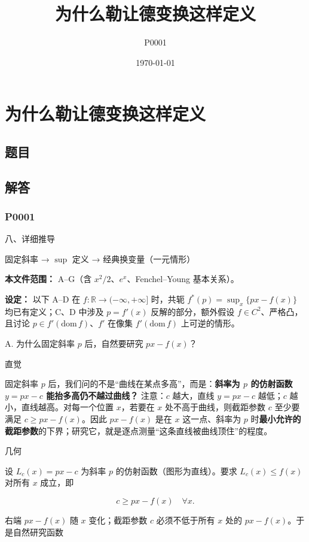 \documentclass[
    lang=cn,
    color=blue,
    mode=fancy,
    thmcnt=section,
    scheme=chinese
]{elegantbook}
\title{为什么勒让德变换这样定义}
\subtitle{P0001}
\author{}
\institute{}
\date{\today}
\begin{document}
\maketitle
\mainmatter

\chapter{为什么勒让德变换这样定义}

\section{题目}

\section{解答}
\subsection{P0001}
八、详细推导

固定斜率 → $\sup$ 定义 → 经典换变量（一元情形）

\textbf{本文件范围：} A–G（含 $x^2/2$、$e^x$、Fenchel–Young 基本关系）。

\textbf{设定：} 以下 A–D 在 $f : \mathbb{R} \to (-\infty, +\infty]$ 时，共轭 $f^*(p)=\sup_x\{px-f(x)\}$ 均已有定义；C、D 中涉及 $p=f'(x)$ 反解的部分，额外假设 $f \in C^2$、严格凸，且讨论 $p \in f'(\mathrm{dom}\, f)$、$f'$ 在像集 $f'(\mathrm{dom}\, f)$ 上可逆的情形。

\par
A. 为什么固定斜率 $p$ 后，自然要研究 $px - f(x)$？

直觉

固定斜率 $p$ 后，我们问的不是“曲线在某点多高”，而是：\textbf{斜率为 $p$ 的仿射函数 $y=px-c$ 能抬多高仍不越过曲线？} 注意：$c$ 越大，直线 $y=px-c$ 越低；$c$ 越小，直线越高。对每一个位置 $x$，若要在 $x$ 处不高于曲线，则截距参数 $c$ 至少要满足 $c \ge px - f(x)$。因此 $px - f(x)$ 是在 $x$ 这一点、斜率为 $p$ 时\textbf{最小允许的截距参数}的下界；研究它，就是逐点测量“这条直线被曲线顶住”的程度。

几何

设 $L_c(x) = px - c$ 为斜率 $p$ 的仿射函数（图形为直线）。要求 $L_c(x) \le f(x)$ 对所有 $x$ 成立，即

\[
c \ge px - f(x) \quad \forall x.
\]

右端 $px - f(x)$ 随 $x$ 变化；截距参数 $c$ 必须不低于所有 $x$ 处的 $px - f(x)$。于是自然研究函数
\end{document}
